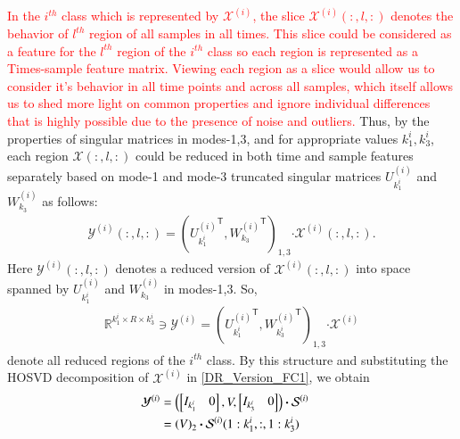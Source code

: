 \documentclass[preprint,12pt]{elsarticle}
\newcommand{\trans}{\mathsf{T}}
\begin{document}
\textcolor{red}{
	In the $i^{th}$ class which is represented by $\mathcal{X}^{(i)}$, the slice $\mathcal{X}^{(i)}(:,l,:)$ denotes
	the  behavior of $l^{th}$  region of all samples in all times.    
	This slice could be considered as a feature for the $l^{th}$ region of the $i^{th}$ class so each region is represented as a  Times-sample feature matrix. Viewing each region as a slice would allow us to consider it's behavior in all time points and across all samples, which itself allows us to shed more light on common properties and ignore individual differences that is highly possible due to the presence of noise and outliers.}
Thus, by the properties of singular matrices in modes-1,3, and for appropriate values
$k_1^i,k_3^i$, each region $\mathcal{X}(:,l,:)$ could be reduced in both time and sample features separately
based on mode-1 and mode-3 truncated singular matrices $U_{k_1^i}^{(i)}$ and $W_{k_3}^{(i)}$
as follows:
\begin{eqnarray}
\mathcal{Y}^{(i)}(:,l,:) = \left( 
{U_{k_1^i}^{(i)}}^{\trans},  {W_{k_3}^{(i)}}^{\trans} 
\right)_{1,3} \boldsymbol{\cdot} \mathcal{X}^{(i)}(:,l,:).
\end{eqnarray}
Here $\mathcal{Y}^{(i)}(:,l,:)$  denotes a reduced version of $\mathcal{X}^{(i)}(:,l,:)$ into space
spanned by $U_{k_1^i}^{(i)}$ and $W_{k_3}^{(i)}$ in modes-1,3. So,
\begin{align}
\mathbb{R}^{k_1^i \times R \times k_3^i} \ni  {{\mathcal{Y}^{(i)}}} = \left( 
{U_{k_1^i}^{(i)}}^{\trans}, {W_{k^i_3}^{(i)}}^{\trans} 
\right)_{1,3}\boldsymbol{\cdot} \mathcal{X}^{(i)} \label{DR_Version_FC1}
\end{align} 
denote all reduced regions of the $i^{th}$ class. By this structure  and substituting the HOSVD decomposition of $\mathcal{X}^{(i)}$ in \eqref{DR_Version_FC1},  we obtain
\begin{align}
{\mathcal{Y}}^{(i)}&=  \notag
\left(
\begin{bmatrix}
I_{k_1^i} &  0
\end{bmatrix},
V,
\begin{bmatrix}
I_{k_3^i} &  0
\end{bmatrix}
\right)\boldsymbol{\cdot} \mathcal{S}^{(i)} \notag
\\&=\left( 
V
\right)_{2} \boldsymbol{\cdot} \mathcal{S}^{(i)}(1:k_1^i,:, 1:k_3^i) \notag &
\end{align}
\end{document}
